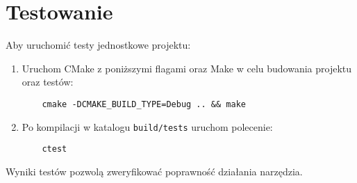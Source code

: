 \section{Testowanie}
Aby uruchomić testy jednostkowe projektu:
\begin{enumerate}
    \item Uruchom CMake z poniższymi flagami oraz Make w celu budowania projektu oraz testów:
    \begin{verbatim}
    cmake -DCMAKE_BUILD_TYPE=Debug .. && make
    \end{verbatim}
    \item Po kompilacji w katalogu \texttt{build/tests} uruchom polecenie:
    \begin{verbatim}
    ctest
    \end{verbatim}
\end{enumerate}
Wyniki testów pozwolą zweryfikować poprawność działania narzędzia.
